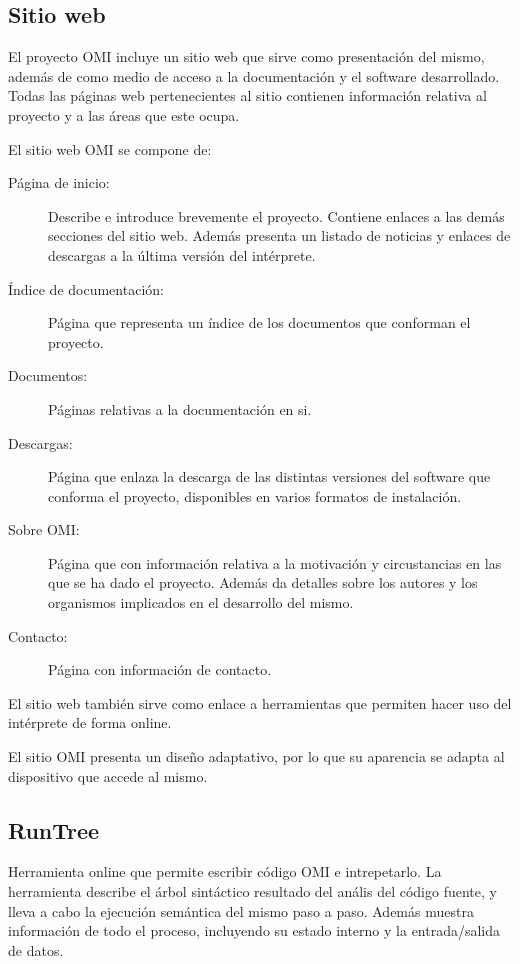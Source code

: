 \subsection{Sitio web}
El proyecto OMI incluye un sitio web que sirve como presentación del mismo, además de como medio de acceso a la documentación 
y el software desarrollado. Todas las páginas web pertenecientes al sitio contienen información relativa al proyecto y a las áreas que este
ocupa. 

El sitio web OMI se compone de: 

\begin{description}
\item [Página de inicio:] Describe e introduce brevemente el proyecto. Contiene enlaces a las demás secciones del sitio web. Además presenta un
listado de noticias y enlaces de descargas a la última versión del intérprete.
\item [Índice de documentación:] Página que representa un índice de los documentos que conforman el proyecto.
\item [Documentos:] Páginas relativas a la documentación en si.
\item [Descargas:] Página que enlaza la descarga de las distintas versiones del software que conforma el proyecto, disponibles en varios formatos de instalación.
\item [Sobre OMI:] Página que con información relativa a la motivación y circustancias en las que se ha dado el proyecto. Además da detalles sobre los autores y los
organismos implicados en el desarrollo del mismo.
\item [Contacto:] Página con información de contacto.
\end{description}

El sitio web también sirve como enlace a herramientas que permiten hacer uso del intérprete de forma online.

El sitio OMI presenta un diseño adaptativo, por lo que su aparencia se adapta al dispositivo que accede al mismo. 

\subsection{RunTree} 
Herramienta online que permite escribir código OMI e intrepetarlo. La herramienta describe el árbol sintáctico resultado del anális del código fuente, y lleva a cabo la ejecución
semántica del mismo paso a paso. Además muestra información de todo el proceso, incluyendo su estado interno y la entrada/salida de datos. 

